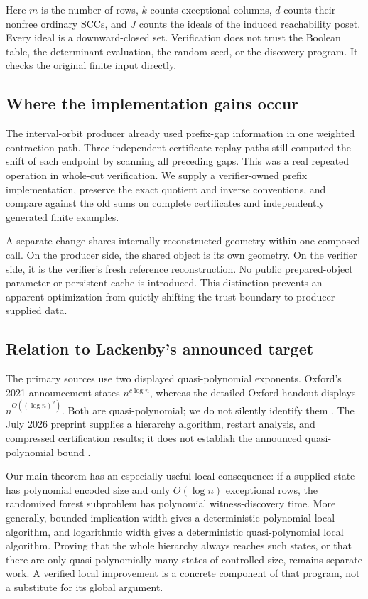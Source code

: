 Here $m$ is the number of rows, $k$ counts exceptional columns, $d$ counts
their nonfree ordinary SCCs, and $J$ counts the ideals of the induced
reachability poset.  Every ideal is a downward-closed set.  Verification
does not trust the Boolean table, the determinant evaluation, the random
seed, or the discovery program.  It checks the original finite input directly.

\subsection{Where the implementation gains occur}

The interval-orbit producer already used prefix-gap information in one
weighted contraction path.  Three independent certificate replay paths
still computed the shift of each endpoint by scanning all preceding gaps.
This was a real repeated operation in whole-cut verification.  We supply
a verifier-owned prefix implementation, preserve the exact quotient and
inverse conventions, and compare against the old sums on complete
certificates and independently generated finite examples.

A separate change shares internally reconstructed geometry within one
composed call.  On the producer side, the shared object is its own geometry.
On the verifier side, it is the verifier's fresh reference reconstruction.
No public prepared-object parameter or persistent cache is introduced.
This distinction prevents an apparent optimization from quietly shifting
the trust boundary to producer-supplied data.

\subsection{Relation to Lackenby's announced target}

The primary sources use two displayed quasi-polynomial exponents.  Oxford's
2021 announcement states $n^{c\log n}$, whereas the detailed Oxford handout
displays $n^{O((\log n)^2)}$.  Both are quasi-polynomial; we do not silently
identify them \cite{Oxford2021,LackenbyTalk2021}.  The July 2026 preprint
supplies a hierarchy algorithm, restart analysis, and compressed certification
results; it does not establish the announced quasi-polynomial bound
\cite{Lackenby2026}.

Our main theorem has an especially useful local consequence: if a supplied
state has polynomial encoded size and only $O(\log n)$ exceptional rows,
the randomized forest subproblem has polynomial witness-discovery time.
More generally, bounded implication width gives a deterministic polynomial
local algorithm, and logarithmic width gives a deterministic quasi-polynomial
local algorithm.
Proving that the whole hierarchy always reaches such states, or that
there are only quasi-polynomially many states of controlled size, remains
separate work.  A verified local improvement is a concrete component of
that program, not a substitute for its global argument.

